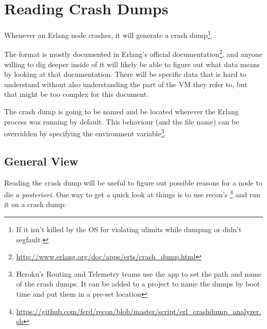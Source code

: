 \chapter{Reading Crash Dumps}
\label{chap:crash-dumps}

Whenever an Erlang node crashes, it will generate a crash dump\footnote{If it isn't killed by the OS for violating ulimits while dumping or didn't segfault.}.

The format is mostly documented in Erlang's official documentation\footnote{\href{http://www.erlang.org/doc/apps/erts/crash\_dump.html}{http://www.erlang.org/doc/apps/erts/crash\_dump.html}}, and anyone willing to dig deeper inside of it will likely be able to figure out what data means by looking at that documentation. There will be specific data that is hard to understand without also understanding the part of the VM they refer to, but that might be too complex for this document.

The crash dump is going to be named  and be located wherever the Erlang process was running by default. This behaviour (and the file name) can be overridden by specifying the  environment variable\footnote{Heroku's Routing and Telemetry teams use the  app to set the path and name of the crash dumps. It can be added to a project to name the dumps by boot time and put them in a pre-set location}.

\section{General View}
\label{sec:crashdump-general-view}

Reading the crash dump will be useful to figure out possible reasons for a node to die \emph{a posteriori}. One way to get a quick look at things is to use recon's \footnote{\href{https://github.com/ferd/recon/blob/master/script/erl\_crashdump\_analyzer.sh}{https://github.com/ferd/recon/blob/master/script/erl\_crashdump\_analyzer.sh}} and run it on a crash dump:

